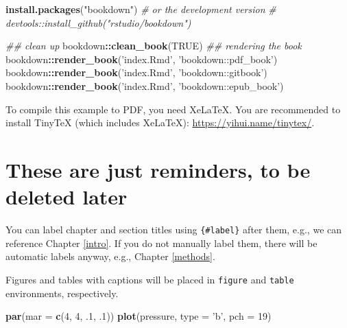 \documentclass[12pt,]{scrbook}
\newenvironment{Shaded}{\begin{snugshade}}{\end{snugshade}}
\newcommand{\CommentTok}[1]{\textcolor[rgb]{0.56,0.35,0.01}{\textit{#1}}}
\newcommand{\DataTypeTok}[1]{\textcolor[rgb]{0.13,0.29,0.53}{#1}}
\newcommand{\DecValTok}[1]{\textcolor[rgb]{0.00,0.00,0.81}{#1}}
\newcommand{\FloatTok}[1]{\textcolor[rgb]{0.00,0.00,0.81}{#1}}
\newcommand{\KeywordTok}[1]{\textcolor[rgb]{0.13,0.29,0.53}{\textbf{#1}}}
\newcommand{\NormalTok}[1]{#1}
\newcommand{\OperatorTok}[1]{\textcolor[rgb]{0.81,0.36,0.00}{\textbf{#1}}}
\newcommand{\OtherTok}[1]{\textcolor[rgb]{0.56,0.35,0.01}{#1}}
\newcommand{\StringTok}[1]{\textcolor[rgb]{0.31,0.60,0.02}{#1}}
\begin{document}
\begin{Shaded}
\begin{Highlighting}[]
\KeywordTok{install.packages}\NormalTok{(}\StringTok{"bookdown"}\NormalTok{)}
\CommentTok{# or the development version}
\CommentTok{# devtools::install_github("rstudio/bookdown")}

\CommentTok{## clean up }
\NormalTok{bookdown}\OperatorTok{::}\KeywordTok{clean_book}\NormalTok{(}\OtherTok{TRUE}\NormalTok{)}
\CommentTok{## rendering the book}
\NormalTok{bookdown}\OperatorTok{::}\KeywordTok{render_book}\NormalTok{(}\StringTok{'index.Rmd'}\NormalTok{, }\StringTok{'bookdown::pdf_book'}\NormalTok{)}
\NormalTok{bookdown}\OperatorTok{::}\KeywordTok{render_book}\NormalTok{(}\StringTok{'index.Rmd'}\NormalTok{, }\StringTok{'bookdown::gitbook'}\NormalTok{)}
\NormalTok{bookdown}\OperatorTok{::}\KeywordTok{render_book}\NormalTok{(}\StringTok{'index.Rmd'}\NormalTok{, }\StringTok{'bookdown::epub_book'}\NormalTok{)}
\end{Highlighting}
\end{Shaded}

To compile this example to PDF, you need XeLaTeX. You are recommended to install TinyTeX (which includes XeLaTeX): \url{https://yihui.name/tinytex/}.

\hypertarget{these-are-just-reminders-to-be-deleted-later}{%
\section{These are just reminders, to be deleted later}\label{these-are-just-reminders-to-be-deleted-later}}

You can label chapter and section titles using \texttt{\{\#label\}} after them, e.g., we can reference Chapter \ref{intro}. If you do not manually label them, there will be automatic labels anyway, e.g., Chapter \ref{methods}.

Figures and tables with captions will be placed in \texttt{figure} and \texttt{table} environments, respectively.

\begin{Shaded}
\begin{Highlighting}[]
\KeywordTok{par}\NormalTok{(}\DataTypeTok{mar =} \KeywordTok{c}\NormalTok{(}\DecValTok{4}\NormalTok{, }\DecValTok{4}\NormalTok{, }\FloatTok{.1}\NormalTok{, }\FloatTok{.1}\NormalTok{))}
\KeywordTok{plot}\NormalTok{(pressure, }\DataTypeTok{type =} \StringTok{'b'}\NormalTok{, }\DataTypeTok{pch =} \DecValTok{19}\NormalTok{)}
\end{Highlighting}
\end{Shaded}
\end{document}

